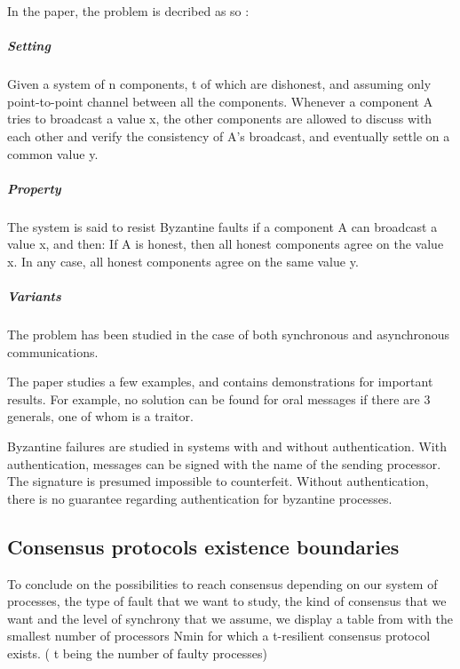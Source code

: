 \documentclass[11pt, twocolumn]{article}
\begin{document}
In the paper, the problem is decribed as so :
\subparagraph{Setting}
Given a system of n components, t of which are dishonest, and assuming only point-to-point channel between all the components.
Whenever a component A tries to broadcast a value x, the other components are allowed to discuss with each other and verify the consistency of A's broadcast, and eventually settle on a common value y.
\subparagraph{Property}
The system is said to resist Byzantine faults if a component A can broadcast a value x, and then:
If A is honest, then all honest components agree on the value x.
In any case, all honest components agree on the same value y.
\subparagraph{Variants}
The problem has been studied in the case of both synchronous and asynchronous communications.


The paper studies a few examples, and contains demonstrations for important results.  For example, no solution can be found for oral messages if there are 3 generals, one of whom is a traitor.

Byzantine failures are studied in systems with and without authentication. With authentication, messages can be signed with the name of the sending processor. The signature is presumed impossible to counterfeit. Without authentication, there is no guarantee regarding authentication for byzantine processes.

\subsection{Consensus protocols existence boundaries}

To conclude on the possibilities to reach consensus depending on our system of processes, the type of fault that we want to study, the kind of consensus that we want and the level of synchrony that we assume,
we display a table from \cite{partialSynchrony} with the smallest number of processors Nmin for which a t-resilient consensus protocol exists. ( t being the number of faulty processes)
\end{document}
